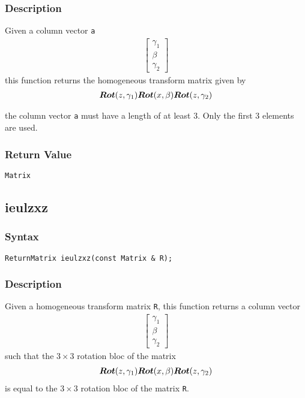\documentclass[11pt,fleqn,letterpaper]{report}
\newcommand{\mbold}[1]{\mbox{\boldmath $ #1 $}}
\newcommand{\matr}[2]{\left[\begin{array}{#1} #2 \end{array}\right]}
\begin{document}
\subsubsection*{Description}
Given a column vector {\tt a} 
\begin{eqnarray}
\matr{c}{\gamma_1 \\ \beta \\ \gamma_2}
\end{eqnarray}
this function returns the homogeneous transform matrix given by 
\begin{eqnarray}
\mbold{Rot}(z,\gamma_1) \mbold{Rot}(x,\beta) \mbold{Rot}(z,\gamma_2)
\end{eqnarray}

 the column vector {\tt a} must have a length of at least 3. 
Only the first 3 elements are used.

\subsubsection*{Return Value}

{\tt Matrix}

\newpage

\subsection*{ieulzxz}
\subsubsection*{Syntax}
\begin{verbatim}
ReturnMatrix ieulzxz(const Matrix & R);
\end{verbatim}
\subsubsection*{Description}
Given a homogeneous transform matrix {\tt R}, this function returns a column vector
\begin{eqnarray}
\matr{c}{\gamma_1 \\ \beta \\ \gamma_2}
\end{eqnarray}
such that the $3 \times 3$ rotation bloc of the matrix
\begin{eqnarray}
\mbold{Rot}(z,\gamma_1) \mbold{Rot}(x,\beta) \mbold{Rot}(z,\gamma_2)
\end{eqnarray}
is equal to the $3 \times 3$ rotation bloc of the matrix {\tt R}.
\end{document}
